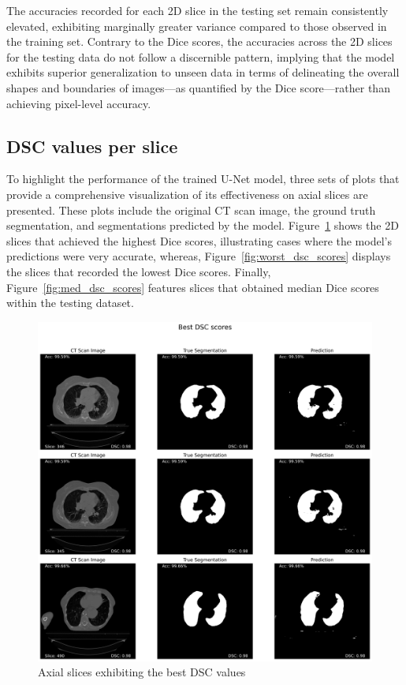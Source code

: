 \documentclass[12pt]{report}
\begin{document}
The accuracies recorded for each 2D slice in the testing set remain consistently elevated, exhibiting marginally greater variance compared to those observed in the training set. Contrary to the Dice scores, the accuracies across the 2D slices for the testing data do not follow a discernible pattern, implying that the model exhibits superior generalization to unseen data in terms of delineating the overall shapes and boundaries of images—as quantified by the Dice score—rather than achieving pixel-level accuracy.

\subsection{DSC values per slice}
\label{subsec:dscs}

To highlight the performance of the trained U-Net model, three sets of plots that provide a comprehensive visualization of its effectiveness on axial slices are presented. These plots include the original CT scan image, the ground truth segmentation, and segmentations predicted by the model. Figure~\ref{fig:best_dsc_scores} shows the 2D slices that achieved the highest Dice scores, illustrating cases where the model’s predictions were very accurate, whereas, Figure~\ref{fig:worst_dsc_scores} displays the slices that recorded the lowest Dice scores. Finally, Figure~\ref{fig:med_dsc_scores} features slices that obtained median Dice scores within the testing dataset.

\begin{figure}[ht!]
    \centering
    \includegraphics[width=\textwidth]{Best_DSC_scores.png}
    \caption{Axial slices exhibiting the best DSC values}
    \label{fig:best_dsc_scores}
\end{figure}
\end{document}
